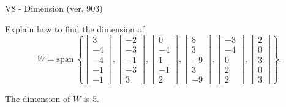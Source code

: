 \begin{exercise}
  \begin{exerciseTitle}V8 - Dimension (ver. 903)\end{exerciseTitle}
  \begin{exerciseStatement}
    Explain how to find the dimension of 
\[W=\mathrm{span}\ \left\{\left[\begin{array}{r}
3 \\
-4 \\
-4 \\
-1 \\
-1
\end{array}\right] , \left[\begin{array}{r}
-2 \\
-3 \\
-1 \\
-3 \\
3
\end{array}\right] , \left[\begin{array}{r}
0 \\
-4 \\
1 \\
-1 \\
2
\end{array}\right] , \left[\begin{array}{r}
8 \\
3 \\
-9 \\
3 \\
-9
\end{array}\right] , \left[\begin{array}{r}
-3 \\
-4 \\
0 \\
2 \\
2
\end{array}\right] , \left[\begin{array}{r}
2 \\
0 \\
3 \\
0 \\
3
\end{array}\right]\right\}.\]



  \end{exerciseStatement}
  \begin{exerciseAnswer}
   The dimension of \(W\) is  \(5\).
  


  \end{exerciseAnswer}
\end{exercise}